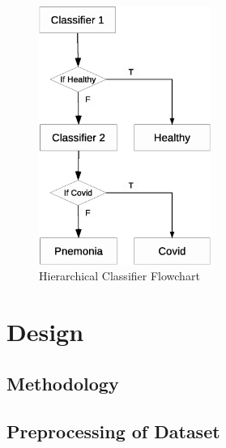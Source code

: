 \documentclass[12pt]{extarticle}
\begin{document}
	\begin{figure}[h]
		\centering
		\includegraphics[width=0.5\textwidth]{pics/Figures/GJU_H.eps}
		\caption{\small{Hierarchical Classifier Flowchart}}
		\label{fig:GJU}
	\end{figure}
	
	
	\newpage
	\section{Design}
	
	\subsection{Methodology}
	
	\subsection{Preprocessing of Dataset}
	
\end{document}
